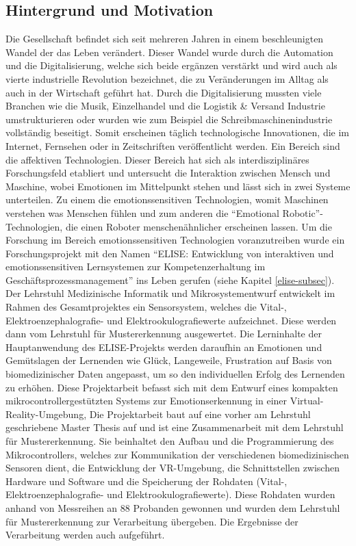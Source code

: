 \subsection{Hintergrund und Motivation} \label{hintergrund-subsec}



Die Gesellschaft befindet sich seit mehreren Jahren in einem beschleunigten Wandel der das Leben ver{\"a}ndert. 
Dieser Wandel wurde durch die Automation und die Digitalisierung, welche sich beide erg{\"a}nzen verst{\"a}rkt und wird auch als vierte industrielle Revolution bezeichnet, die zu Ver{\"a}nderungen im Alltag als auch in der Wirtschaft gef{\"u}hrt hat. 
Durch die Digitalisierung mussten viele Branchen wie die Musik, Einzelhandel und die Logistik \& Versand Industrie umstrukturieren oder wurden wie zum Beispiel die Schreibmaschinenindustrie vollst{\"a}ndig beseitigt. 
Somit erscheinen t{\"a}glich technologische Innovationen, die im Internet, Fernsehen oder in Zeitschriften ver{\"o}ffentlicht werden. 
Ein Bereich sind die affektiven Technologien. 
Dieser Bereich hat sich als interdisziplin{\"a}res Forschungsfeld etabliert und untersucht die Interaktion zwischen Mensch und Maschine, wobei Emotionen im Mittelpunkt stehen und l{\"a}sst sich in zwei Systeme unterteilen. 
Zu einem die emotionssensitiven Technologien, womit Maschinen verstehen was Menschen f{\"u}hlen und zum anderen die ``Emotional Robotic''- Technologien, die einen Roboter menschen{\"a}hnlicher erscheinen lassen. 
Um die Forschung im Bereich emotionssensitiven Technologien voranzutreiben wurde ein Forschungsprojekt mit den Namen ``ELISE: Entwicklung von interaktiven und emotionssensitiven Lernsystemen zur Kompetenzerhaltung im Gesch{\"a}ftsprozessmanagement''  ins Leben gerufen (siehe Kapitel \ref{elise-subsec}).
Der Lehrstuhl Medizinische Informatik und Mikrosystementwurf entwickelt im Rahmen des Gesamtprojektes ein Sensorsystem, welches die Vital-, Elektroenzephalografie- und Elektrookulografiewerte aufzeichnet. 
Diese werden dann vom Lehrstuhl f{\"u}r Mustererkennung ausgewertet. 
Die Lerninhalte der Hauptanwendung des ELISE-Projekts werden daraufhin an Emotionen und Gem{\"u}tslagen der Lernenden wie Gl{\"u}ck, Langeweile, Frustration auf Basis von biomedizinischer Daten angepasst, um so den individuellen Erfolg des Lernenden zu erh{\"o}hen. 
Diese Projektarbeit befasst sich mit dem Entwurf eines kompakten mikrocontrollergest{\"u}tzten Systems zur Emotionserkennung in einer Virtual-Reality-Umgebung, Die Projektarbeit baut auf eine vorher am Lehrstuhl geschriebene Master Thesis  auf\cite{msckroenert} und ist eine Zusammenarbeit mit dem Lehrstuhl f{\"u}r Mustererkennung. 
Sie beinhaltet den Aufbau und die Programmierung des Mikrocontrollers, welches zur Kommunikation der verschiedenen biomedizinischen Sensoren dient, die Entwicklung der VR-Umgebung, die Schnittstellen zwischen Hardware und Software und die Speicherung der Rohdaten (Vital-, Elektroenzephalografie- und Elektrookulografiewerte). 
Diese Rohdaten wurden anhand von Messreihen an 88 Probanden gewonnen und wurden dem Lehrstuhl f{\"u}r Mustererkennung zur Verarbeitung {\"u}bergeben. 
Die Ergebnisse der Verarbeitung werden auch aufgef{\"u}hrt. 

